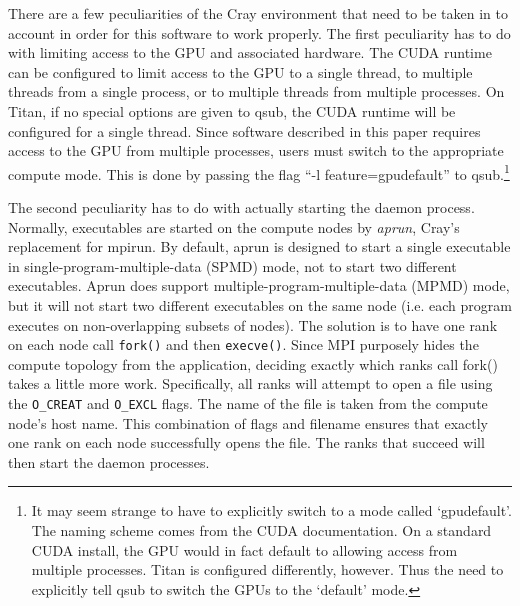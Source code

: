 There are a few peculiarities of the Cray environment that need to be taken in to account in order for this software to work properly.  The first peculiarity has to do with limiting access to the GPU and associated hardware.  The CUDA runtime can be configured to limit access to the GPU to a single thread, to multiple threads from a single process, or to multiple threads from multiple processes.  On Titan, if no special options are given to qsub, the CUDA runtime will be configured for a single thread.  Since software described in this paper requires access to the GPU from multiple processes, users must switch to the appropriate compute mode.  This is done by passing the flag ``-l feature=gpudefault'' to qsub.\footnote{It may seem strange to have to explicitly switch to a mode called `gpudefault'.  The naming scheme comes from the CUDA documentation.  On a standard CUDA install, the GPU would in fact default to allowing access from multiple processes.  Titan is configured differently, however.  Thus the need to explicitly tell qsub to switch the GPUs to the `default' mode.}

The second peculiarity has to do with actually starting the daemon process.  Normally, executables are started on the compute nodes by \emph{aprun}, Cray's replacement for mpirun.  By default, aprun is designed to start a single executable in single-program-multiple-data (SPMD) mode, not to start two different executables.  Aprun does support multiple-program-multiple-data (MPMD) mode, but it will not start two different executables on the same node (i.e. each program executes on non-overlapping subsets of nodes).  The solution is to have one rank on each node call \texttt{fork()} and then \texttt{execve()}.  Since MPI purposely hides the compute topology from the application, deciding exactly which ranks call fork() takes a little more work.  Specifically, all ranks will attempt to open a file using the \texttt{O\_CREAT} and 
\texttt{O\_EXCL} flags.  The name of the file is taken from the compute node's host name.  This combination of flags and filename ensures that exactly one rank on each node successfully opens the file.  The ranks that succeed will then start the daemon processes.

